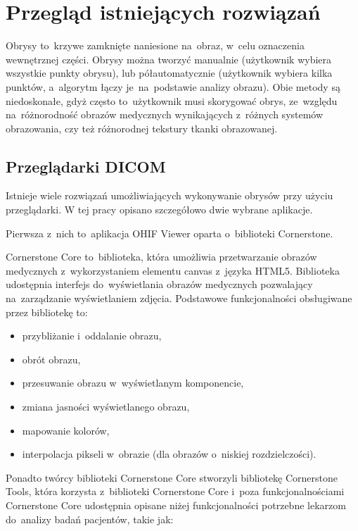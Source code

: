 \documentclass[a4paper,11pt,twoside,openright]{report}
\theoremstyle{definition}
\begin{document}
\section {Przegląd istniejących rozwiązań}

Obrysy to~krzywe zamknięte naniesione na~obraz, w~celu oznaczenia wewnętrznej części.
Obrysy można tworzyć manualnie (użytkownik wybiera wszystkie punkty obrysu), lub
półautomatycznie (użytkownik wybiera kilka punktów, a~algorytm łączy je~na~podstawie
analizy obrazu). Obie metody są niedoskonałe, gdyż często to~użytkownik musi skorygować
obrys, ze~względu na~różnorodność obrazów medycznych wynikających z~różnych systemów
obrazowania, czy też różnorodnej tekstury tkanki obrazowanej.

\subsection {Przeglądarki DICOM}

Istnieje wiele rozwiązań umożliwiających wykonywanie obrysów przy użyciu przeglądarki.
W tej pracy opisano szczegółowo dwie wybrane aplikacje.

Pierwsza z~nich to~aplikacja OHIF Viewer oparta o~biblioteki Cornerstone.

Cornerstone Core \cite{Cornerstone Core} to~biblioteka, która umożliwia przetwarzanie
obrazów medycznych z~wykorzystaniem elementu canvas z~języka HTML5. Biblioteka
udostępnia interfejs do~wyświetlania obrazów medycznych pozwalający na~zarządzanie
wyświetlaniem zdjęcia. Podstawowe funkcjonalności obsługiwane przez bibliotekę to:

\begin{itemize}[noitemsep]
\item przybliżanie i~oddalanie obrazu,
\item obrót obrazu,
\item przesuwanie obrazu w~wyświetlanym komponencie,
\item zmiana jasności wyświetlanego obrazu,
\item mapowanie kolorów,
\item interpolacja pikseli w~obrazie (dla obrazów o~niskiej rozdzielczości).
\end{itemize}

Ponadto twórcy biblioteki Cornerstone Core stworzyli bibliotekę Cornerstone Tools,
która korzysta z~biblioteki Cornerstone Core i~poza funkcjonalnościami
Cornerstone Core udostępnia opisane niżej funkcjonalności
potrzebne lekarzom do~analizy badań pacjentów, takie jak:
\end{document}
